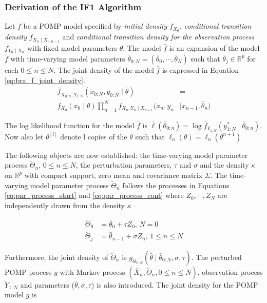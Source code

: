 \documentclass[twoside,openright]{report}
\begin{document}
\subsubsection{Derivation of the IF1 Algorithm}

Let $f$ be a POMP model specified  by \textit{initial density} $f_{X_0}$, \textit{conditional transition density} $f_{X_n \mid X_{0:n-1}}$ and \textit{conditional transition density for the observation process} $f_{Y_n \mid X_{n}}$ with fixed model parameters $\theta$. The model $\bar{f}$ is an expansion of the model $f$ with time-varying model parameters $\bar{\theta}_{0:N} = (\bar{\theta}_0, \cdots, \bar{\theta}_N)$ such that $\bar{\theta}_j \in \mathbb{R}^{p}$ for each $ 0 \leq n \leq  N$. The joint density of the model $\bar{f}$ is expressed in Equation \ref{eq:bra_f_joint_density}.   
\begin{align}
    \bar{f}_{\bar{X}_{0:N}, \bar{Y}_{1:N}}(x_{0:N}, y_{0:N} \mid \bar{\theta}) &=  \label{eq:bra_f_joint_density} \\
    f_{X_0}(x_0 \mid \theta) \prod_{n = 1}^{N} f_{X_n, Y_n \mid X_{n-1}}(x_n, y_n & \mid x_{n-1}, \bar{\theta}_n)    \nonumber
\end{align}

The log likelihood function for the model $\bar{f}$ is $\bar{\ell}(\bar{\theta}_{0:n}) = \log \bar{f}_{\bar{Y}_{1:N}}(y_{1:N}^{*} \mid \bar{\theta}_{0:n})$. Now also let $\theta^{[l]}$ denote l copies of the $\theta$ such that $\ell_n (\theta) = \bar{\ell}_n (\theta^{n+1})$ 

The following objects are now established: the time-varying model parameter process $\breve{\Theta}_n$, $ 0 \leq n \leq N$, the perturbation parameters, $\tau$ and $\sigma$  and the density $\kappa$ on $\mathbb{R}^{p}$  with compact support, zero mean and covariance matrix $\Sigma$. The time-varying model parameter process $\breve{\Theta}_n$ follows the processes in Equations \ref{eq:par_process_start} and \ref{eq:par_process_cont} where $Z_0, \cdots , Z_N$ are independently drawn from the density $\kappa$

\begin{align}
    \breve{\Theta}_0 &= \bar{\theta}_0 + \tau Z_0 , \, N = 0 \label{eq:par_process_start} \\
    \breve{\Theta}_j &= \bar{\theta}_{n-1} + \sigma Z_n , \, 1 \leq n \leq N \label{eq:par_process_cont}
\end{align}



Furthermore, the joint density of $\breve{\Theta}_n$ is $g_{\breve{\Theta}_{0:N}}( \breve{\bar{ \theta }} \mid \bar{\theta}_{0:N}, \sigma, \tau)$. The  perturbed POMP process $g$ with Markov process $(\breve{X_n}, \breve{\Theta}_n, 0 \leq n \leq N)$, observation process $\breve{Y}_{1:N}$ and parameters ($\bar{\theta}, \sigma, \tau$) is also introduced. The joint density for the POMP model $g$ is
\end{document}
